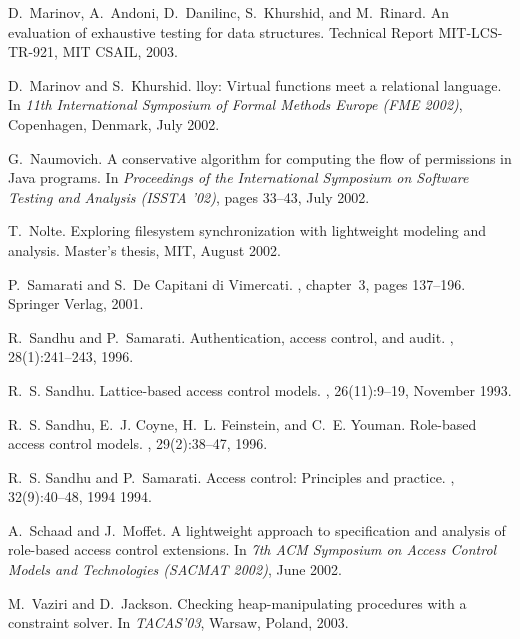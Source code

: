 \documentclass{acm_proc_article-sp}
\begin{document}
\begin{thebibliography}{10}
D.~Marinov, A.~Andoni, D.~Danilinc, S.~Khurshid, and M.~Rinard.
\newblock An evaluation of exhaustive testing for data structures.
\newblock Technical Report MIT-LCS-TR-921, MIT CSAIL, 2003.

D.~Marinov and S.~Khurshid.
lloy: Virtual functions meet a relational language.
\newblock In {\em 11th International Symposium of Formal Methods Europe (FME
  2002)}, Copenhagen, Denmark, July 2002.

G.~Naumovich.
\newblock A conservative algorithm for computing the flow of permissions in
  {J}ava programs.
\newblock In {\em Proceedings of the International Symposium on Software
  Testing and Analysis ({ISSTA} '02)}, pages 33--43, July 2002.

T.~Nolte.
\newblock Exploring filesystem synchronization with lightweight modeling and
  analysis.
\newblock Master's thesis, MIT, August 2002.

P.~Samarati and S.~{De Capitani di Vimercati}.
, chapter~3, pages
  137--196.
\newblock Springer Verlag, 2001.

R.~Sandhu and P.~Samarati.
\newblock Authentication, access control, and audit.
, 28(1):241--243, 1996.

R.~S. Sandhu.
\newblock Lattice-based access control models.
, 26(11):9--19, November 1993.

\balancecolumns
{}
R.~S. Sandhu, E.~J. Coyne, H.~L. Feinstein, and C.~E. Youman.
\newblock Role-based access control models.
, 29(2):38--47, 1996.

R.~S. Sandhu and P.~Samarati.
\newblock Access control: Principles and practice.
, 32(9):40--48, 1994 1994.

A.~Schaad and J.~Moffet.
\newblock A lightweight approach to specification and analysis of role-based access control extensions.
\newblock In {\em 7th ACM Symposium on Access Control Models and Technologies (SACMAT 2002)}, June 2002.

M.~Vaziri and D.~Jackson.
\newblock Checking heap-manipulating procedures with a constraint solver.
\newblock In {\em TACAS'03}, Warsaw, Poland, 2003.


\end{thebibliography}
\end{document}
